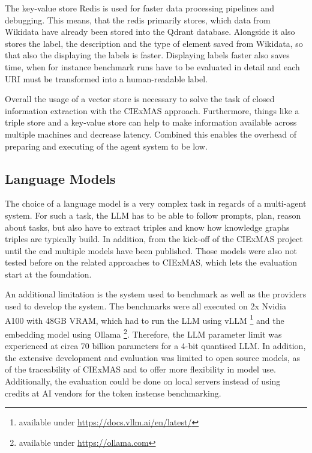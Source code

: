 \documentclass[a4paper,oneside,bibliography=totoc]{scrbook}
\begin{document}
The key-value store Redis is used for faster data processing pipelines and debugging. This means, that the redis primarily stores, which data from Wikidata have already been stored into the Qdrant database. Alongside it also stores the label, the description and the type of element saved from Wikidata, so that also the displaying the labels is faster. Displaying labels faster also saves time, when for instance benchmark runs have to be evaluated in detail and each URI must be transformed into a human-readable label.

Overall the usage of a vector store is necessary to solve the task of closed information extraction with the CIExMAS approach. Furthermore, things like a triple store and a key-value store can help to make information available across multiple machines and decrease latency. Combined this enables the overhead of preparing and executing of the agent system to be low.

\subsection{Language Models}
\label{subsec:eval_language_models}

The choice of a language model is a very complex task in regards of a multi-agent system. For such a task, the \ac{LLM} has to be able to follow prompts, plan, reason about tasks, but also have to extract triples and know how knowledge graphs triples are typically build. In addition, from the kick-off of the CIExMAS project until the end multiple models have been published. Those models were also not tested before on the related approaches to CIExMAS, which lets the evaluation start at the foundation.

An additional limitation is the system used to benchmark as well as the providers used to develop the system. The benchmarks were all executed on 2x Nvidia A100 with 48GB VRAM, which had to run the \ac{LLM} using vLLM \footnote{available under \url{https://docs.vllm.ai/en/latest/}} and the embedding model using Ollama \footnote{available under \url{https://ollama.com}}. Therefore, the \ac{LLM} parameter limit was experienced at circa 70 billion parameters for a 4-bit quantised \ac{LLM}. In addition, the extensive development and evaluation was limited to open source models, as of the traceability of CIExMAS and to offer more flexibility in model use. Additionally, the evaluation could be done on local servers instead of using credits at AI vendors for the token instense benchmarking.
\end{document}
